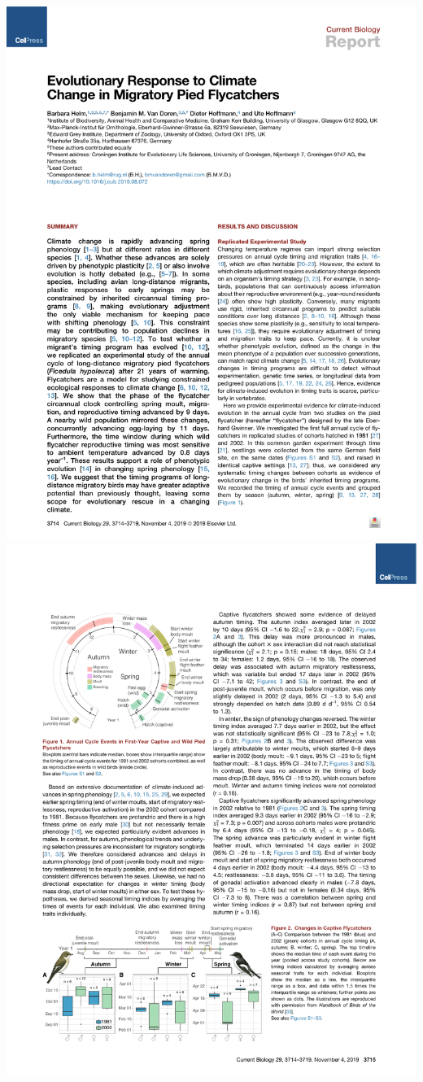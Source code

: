 \documentclass[a4paper, twoside]{templates/ociamthesis}
\begin{document}
\includegraphics[width=1\linewidth]{pdf_chapters/pied/pied_crop_Part01}
\includegraphics[width=1\linewidth]{pdf_chapters/pied/pied_crop_Part02}
\end{document}
